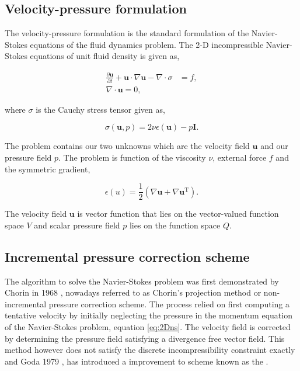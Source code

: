 \subsection{Velocity-pressure formulation}
The velocity-pressure formulation is the standard formulation of the Navier-Stokes equations of the fluid dynamics problem. The 2-D incompressible Navier-Stokes equations of unit fluid density is given as,

	\begin{subequations}
	\begin{align}
	\frac{\partial \mathbf{u}}{\partial t} + \mathbf{u}\cdot\nabla\mathbf{u} - \nabla \cdot \sigma &= f,\\
	\nabla \cdot \mathbf{u} = 0,
	\end{align}	
	\label{eq:2Dns}
	\end{subequations}

where $\sigma$ is the Cauchy stress tensor given as,

	\begin{equation}
	\sigma(\mathbf{u},p) = 2\nu\epsilon(\mathbf{u}) - p\mathbf{I}.
	\end{equation}

The problem contains our two unknowns which are the velocity field $\mathbf{u}$ and our pressure field $p$. The problem is function of the viscosity $\nu$, external force $f$ and the symmetric gradient,

	\begin{equation}
	\epsilon(u) = \frac{1}{2} \left(\nabla \mathbf{u} + \nabla \mathbf{u}^{\mathrm{T}}\right).
	\label{eq:symGrad}
	\end{equation}

The velocity field $\mathbf{u}$ is vector function that lies on the vector-valued function space $V$ and scalar pressure field $p$ lies on the function space $Q$.

\subsection{Incremental pressure correction scheme}

The algorithm to solve the Navier-Stokes problem was first demonstrated by Chorin in 1968 \cite{Chorin1968}, nowadays referred to as Chorin's projection method or non-incremental pressure correction scheme. The process relied on first computing a tentative velocity by initially neglecting the pressure in the momentum equation of the Navier-Stokes problem, equation \ref{eq:2Dns}. The velocity field is corrected by determining the pressure field satisfying a divergence free vector field. This method however does not satisfy the discrete incompressibility constraint exactly and Goda 1979 \cite{Goda1979a}, has introduced a improvement to scheme known as the .


